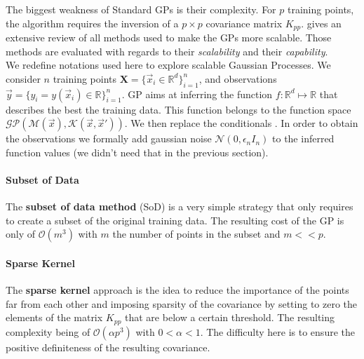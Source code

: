 The biggest weakness of Standard GPs is their complexity. For $p$ training points, the algorithm requires the inversion of a $p \times p$ covariance matrix $K_{pp}$. \citet{liu_when_2018} gives an extensive review of all methods used to make the GPs more scalable. Those methods are evaluated with regards to their \textit{scalability} and their \textit{capability}. \\ 

We redefine notations used here to explore scalable Gaussian Processes.  We consider $n$ training points $\mathbf{X}= \{\vec{x}_i \in \mathbb{R}^d \}^n_{i=1}$, and observations $\vec{y} = \{y_i = y(\vec{x}_i) \in \mathbb{R} \}^n_{i=1} $. GP aims at inferring the function $f : \mathbb{R}^d \mapsto \mathbb{R}$ that describes the best the training data. This function belongs to the  function space $\mathcal{GP}(\mathcal{M}(\vec{x}), \mathcal{K}(\vec{x},\vec{x}'))$. We then replace the conditionals .  In order to obtain the observations we formally add gaussian noise $\mathcal{N}(0,\epsilon_nI_n)$ to the inferred function values (we didn't need that in the previous section). 


 
 \paragraph{Subset of Data}



The \textbf{subset of data method} (SoD) is a very simple strategy that only requires to create a subset of the original training data. The resulting cost of the GP is only of $\mathcal{O}(m^3)$ with $m$ the number of points in the subset and $m << p$.  \\

 \paragraph{Sparse Kernel}
 
The \textbf{sparse kernel} approach is the idea to reduce the importance of the points far from each other and imposing sparsity of the covariance by setting to zero the elements of the matrix $K_{pp}$ that are below a certain threshold. The resulting complexity being of $\mathcal{O}(\alpha p^3)$ with $0 < \alpha < 1$. The difficulty here is to ensure the positive definiteness of the resulting covariance. \\

